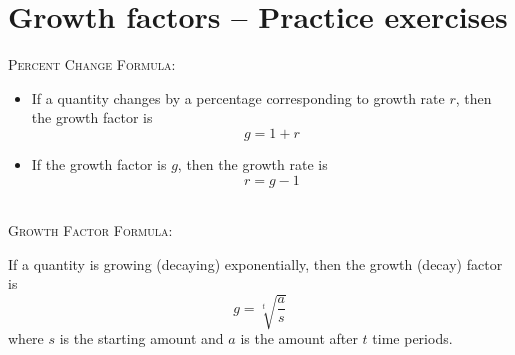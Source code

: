 
\section{Growth factors -- Practice exercises}

\noindent \hrulefill
 \bigskip
 
 \noindent \textsc{Percent Change Formula:} 
\begin{itemize}
\item   If a quantity changes by a percentage corresponding to growth rate $r$, then the growth factor is $$\displaystyle g=1+r$$
\item If the growth factor is $g$, then the growth rate is $$r = g-1$$ ~
\end{itemize}
 
\noindent \textsc{Growth Factor Formula:} \bigskip

If a quantity is growing (decaying) exponentially, then the growth (decay) factor is 
$$\displaystyle g = \sqrt[t]{\frac{a}{s}}$$ 
\quad where $s$ is the starting amount and $a$ is the amount after $t$ time periods.

\bigskip 
 \noindent \hrulefill
 
\newpage %
 
